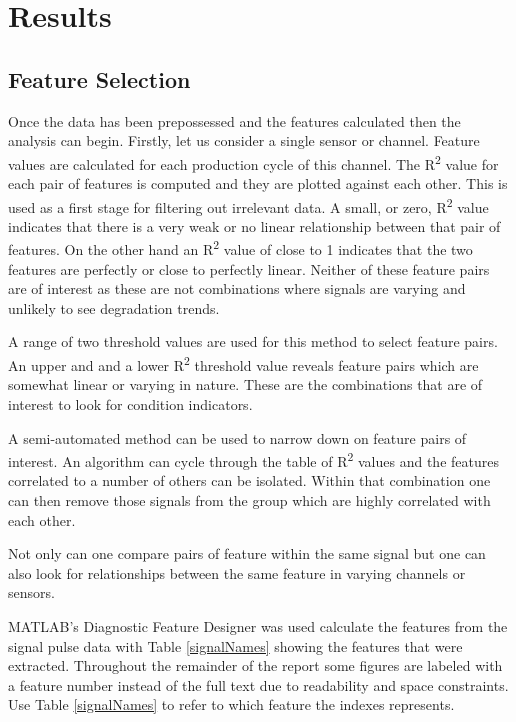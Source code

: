 \documentclass[]{article}
\begin{document}
 

\section{Results}
\subsection{Feature Selection}
Once the data has been prepossessed and the features calculated then the analysis can begin. Firstly, let us consider a single sensor or channel. Feature values are calculated for each production cycle of this channel. The R\textsuperscript{2} value for each pair of features is computed and they are plotted against each other. This is used as a first stage for filtering out irrelevant data. A small, or zero, R\textsuperscript{2} value indicates that there is a very weak or no linear relationship between that pair of features. On the other hand an R\textsuperscript{2} value of close to 1 indicates that the two features are perfectly or close to perfectly linear. Neither of these feature pairs are of interest as these are not combinations where signals are varying and unlikely to see degradation trends. 

A range of two threshold values are used for this method to select feature pairs. An upper and and a lower R\textsuperscript{2} threshold value reveals feature pairs which are somewhat linear or varying in nature. These are the combinations that are of interest to look for condition indicators.

A semi-automated method can be used to narrow down on feature pairs of interest. An algorithm can cycle through the table of R\textsuperscript{2} values and the features correlated to a number of others can be isolated. Within that combination one can then remove those signals from the group which are highly correlated with each other.

Not only can one compare pairs of feature within the same signal but one can also look for relationships between the same feature in varying channels or sensors. 

MATLAB's Diagnostic Feature Designer was used calculate the features from the signal pulse data with Table \ref{signalNames} showing the features that were extracted. Throughout the remainder of the report some figures are labeled with a feature number instead of the full text due to readability and space constraints. Use Table \ref{signalNames} to refer to which feature the indexes represents.
\end{document}

